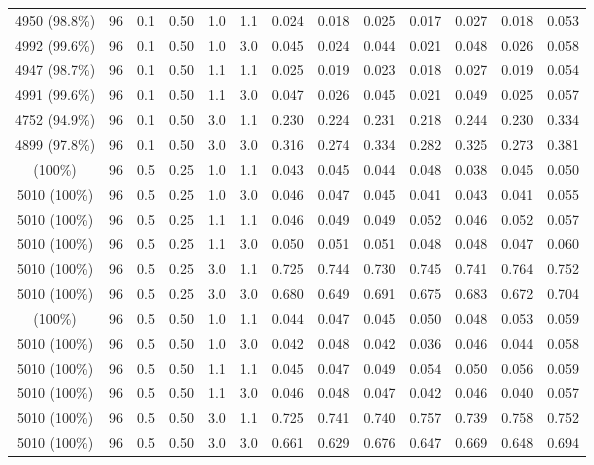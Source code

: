 \begin{longtable}[t]{ccccccrrrrrrc}
4950 (98.8\%) & 96 & 0.1 & 0.50 & 1.0 & 1.1 & 0.024 & 0.018 & 0.025 & 0.017 & 0.027 & 0.018 & 0.053\\
4992 (99.6\%) & 96 & 0.1 & 0.50 & 1.0 & 3.0 & 0.045 & 0.024 & 0.044 & 0.021 & 0.048 & 0.026 & 0.058\\
4947 (98.7\%) & 96 & 0.1 & 0.50 & 1.1 & 1.1 & 0.025 & 0.019 & 0.023 & 0.018 & 0.027 & 0.019 & 0.054\\
4991 (99.6\%) & 96 & 0.1 & 0.50 & 1.1 & 3.0 & 0.047 & 0.026 & 0.045 & 0.021 & 0.049 & 0.025 & 0.057\\
4752 (94.9\%) & 96 & 0.1 & 0.50 & 3.0 & 1.1 & 0.230 & 0.224 & 0.231 & 0.218 & 0.244 & 0.230 & 0.334\\
4899 (97.8\%) & 96 & 0.1 & 0.50 & 3.0 & 3.0 & 0.316 & 0.274 & 0.334 & 0.282 & 0.325 & 0.273 & 0.381\\
\addlinespace
5010 (100\%) & 96 & 0.5 & 0.25 & 1.0 & 1.1 & 0.043 & 0.045 & 0.044 & 0.048 & 0.038 & 0.045 & 0.050\\
5010 (100\%) & 96 & 0.5 & 0.25 & 1.0 & 3.0 & 0.046 & 0.047 & 0.045 & 0.041 & 0.043 & 0.041 & 0.055\\
5010 (100\%) & 96 & 0.5 & 0.25 & 1.1 & 1.1 & 0.046 & 0.049 & 0.049 & 0.052 & 0.046 & 0.052 & 0.057\\
5010 (100\%) & 96 & 0.5 & 0.25 & 1.1 & 3.0 & 0.050 & 0.051 & 0.051 & 0.048 & 0.048 & 0.047 & 0.060\\
5010 (100\%) & 96 & 0.5 & 0.25 & 3.0 & 1.1 & 0.725 & 0.744 & 0.730 & 0.745 & 0.741 & 0.764 & 0.752\\
5010 (100\%) & 96 & 0.5 & 0.25 & 3.0 & 3.0 & 0.680 & 0.649 & 0.691 & 0.675 & 0.683 & 0.672 & 0.704\\
\addlinespace
5010 (100\%) & 96 & 0.5 & 0.50 & 1.0 & 1.1 & 0.044 & 0.047 & 0.045 & 0.050 & 0.048 & 0.053 & 0.059\\
5010 (100\%) & 96 & 0.5 & 0.50 & 1.0 & 3.0 & 0.042 & 0.048 & 0.042 & 0.036 & 0.046 & 0.044 & 0.058\\
5010 (100\%) & 96 & 0.5 & 0.50 & 1.1 & 1.1 & 0.045 & 0.047 & 0.049 & 0.054 & 0.050 & 0.056 & 0.059\\
5010 (100\%) & 96 & 0.5 & 0.50 & 1.1 & 3.0 & 0.046 & 0.048 & 0.047 & 0.042 & 0.046 & 0.040 & 0.057\\
5010 (100\%) & 96 & 0.5 & 0.50 & 3.0 & 1.1 & 0.725 & 0.741 & 0.740 & 0.757 & 0.739 & 0.758 & 0.752\\
5010 (100\%) & 96 & 0.5 & 0.50 & 3.0 & 3.0 & 0.661 & 0.629 & 0.676 & 0.647 & 0.669 & 0.648 & 0.694\\
\bottomrule
\end{longtable}
\endgroup{}

